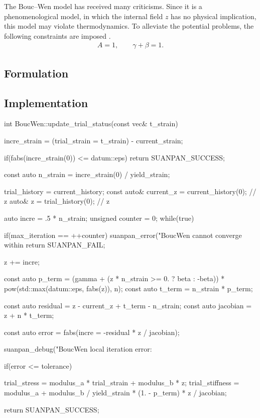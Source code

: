 The Bouc--Wen model has received many criticisms. Since it is a phenomenological model, in which the internal field $z$ has no physical implication, this model may violate thermodynamics.
To alleviate the potential problems, the following constraints are imposed \cite{Ma2004}.
\begin{gather}
A=1,\qquad\gamma+\beta=1.
\end{gather}
\subsection{Formulation}
\subsection{Implementation}
\begin{cppcode}
int BoucWen::update_trial_status(const vec& t_strain) {
    incre_strain = (trial_strain = t_strain) - current_strain;

    if(fabs(incre_strain(0)) <= datum::eps) return SUANPAN_SUCCESS;

    const auto n_strain = incre_strain(0) / yield_strain;

    trial_history = current_history;
    const auto& current_z = current_history(0); // z
    auto& z = trial_history(0);                 // z

    auto incre = .5 * n_strain;
    unsigned counter = 0;
    while(true) {
        if(max_iteration == ++counter) {
            suanpan_error("BoucWen cannot converge within %
            return SUANPAN_FAIL;
        }

        z += incre;

        const auto p_term = (gamma + (z * n_strain >= 0. ? beta : -beta)) * pow(std::max(datum::eps, fabs(z)), n);
        const auto t_term = n_strain * p_term;

        const auto residual = z - current_z + t_term - n_strain;
        const auto jacobian = z + n * t_term;

        const auto error = fabs(incre = -residual * z / jacobian);

        suanpan_debug("BoucWen local iteration error: %

        if(error <= tolerance) {
            trial_stress = modulus_a * trial_strain + modulus_b * z;
            trial_stiffness = modulus_a + modulus_b / yield_strain * (1. - p_term) * z / jacobian;

            return SUANPAN_SUCCESS;
        }
    }
}
\end{cppcode}

